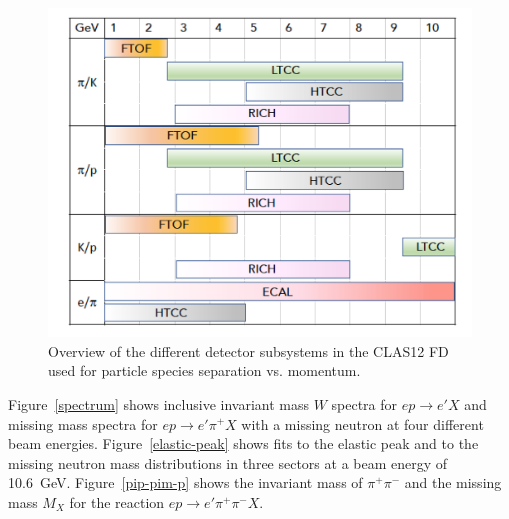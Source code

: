 \documentclass[final,3p,twocolumn]{elsarticle}
\begin{document}
\begin{figure}[tp!]
\centerline{\includegraphics[width=1.0\columnwidth]{CLAS12-pid.png}}
\caption{Overview of the different detector subsystems in the CLAS12 FD used for particle species separation
  vs. momentum.}
\label{pid1}
\end{figure} 

Figure~\ref{spectrum} shows inclusive invariant mass $W$ spectra for $ep \to e' X$ and missing mass spectra
for $ep \to e' \pi^+ X$ with a missing neutron at four different beam energies. Figure~\ref{elastic-peak} shows
fits to the elastic peak and to the missing neutron mass distributions in three sectors at a beam energy of 10.6~GeV.
Figure~\ref{pip-pim-p} shows the invariant mass of $\pi^+\pi^-$ and the missing mass $M_X$ for the reaction
$ep \to e' \pi^+ \pi^- X$.  
\end{document}
